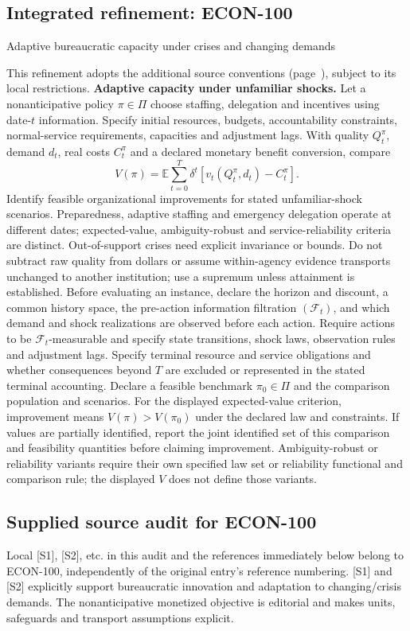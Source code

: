 \documentclass[11pt,a4paper]{article}
\begin{document}
\subsection*{Integrated refinement: ECON-100}
{\sffamily\small\color{muted}Adaptive bureaucratic capacity under crises and changing demands\par}
This refinement adopts the additional source conventions
(page~\pageref{audited:conventions}), subject to its local restrictions.
\textbf{Adaptive capacity under unfamiliar shocks.}
Let a nonanticipative policy $\pi\in\Pi$ choose staffing, delegation and
incentives using date-$t$ information. Specify initial resources, budgets,
accountability constraints, normal-service requirements, capacities and
adjustment lags. With quality $Q_t^\pi$, demand $d_t$, real costs $C_t^\pi$ and a
declared monetary benefit conversion, compare
\[
V(\pi)=\mathbb E\sum_{t=0}^{T}\delta^t
              [v_t(Q_t^\pi,d_t)-C_t^\pi].
\]
Identify feasible organizational improvements for stated unfamiliar-shock
scenarios. Preparedness, adaptive staffing and emergency delegation operate at
different dates; expected-value, ambiguity-robust and service-reliability
criteria are distinct. Out-of-support crises need explicit invariance or bounds.
Do not subtract raw quality from dollars or assume within-agency evidence
transports unchanged to another institution; use a supremum unless attainment
is established. Before evaluating an instance, declare the horizon and discount,
a common history space, the pre-action information filtration $(\mathcal F_t)$,
and which demand and shock realizations are observed before each action.
Require actions to be $\mathcal F_t$-measurable and specify state transitions,
shock laws, observation rules and adjustment lags. Specify terminal resource
and service obligations and whether consequences beyond $T$ are excluded or
represented in the stated terminal accounting. Declare a feasible benchmark
$\pi_0\in\Pi$ and the comparison population and scenarios. For the displayed
expected-value criterion, improvement means $V(\pi)>V(\pi_0)$ under the declared
law and constraints. If values are partially identified, report the joint
identified set of this comparison and feasibility quantities before claiming
improvement. Ambiguity-robust or reliability variants require their own
specified law set or reliability functional and comparison rule; the displayed
$V$ does not define those variants.
\subsection*{Supplied source audit for ECON-100}
Local [S1], [S2], etc. in this audit and the references immediately below
belong to ECON-100, independently of the original entry's reference numbering.
[S1] and [S2] explicitly support bureaucratic innovation and adaptation to changing/crisis demands. The nonanticipative monetized objective is editorial and makes units, safeguards and transport assumptions explicit.
\end{document}
